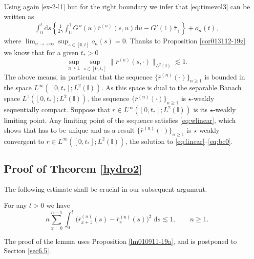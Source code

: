 \documentclass[EJP]{ejpecp} %
\newcommand\T{{\mathbb I}}
\renewcommand{\ge}{\geqslant}
\newcommand{\dd  }{\mathrm{d}}
\renewcommand{\bar}{\overline}
\numberwithin{equation}{section}
\begin{document}
Using again \eqref{ex-2-l1} but for the right boundary we infer that
\eqref{eq:timevol3} can be written as
\begin{equation}\label{eq:timevol31}
  \begin{split}
\int_0^t \dd s\left\{ \frac{1}{2\gamma}\int_0^1G''(u) \bar r^{(n)}(s,u)\dd u- G'(1) \bar\tau_+
\right\}
+o_n(t),
  \end{split}
\end{equation}
 where $\lim_{n\to+\infty} \sup_{s\in[0,t]}o_n(s)=0$.
Thanks to Proposition \ref{cor013112-19z} we know that for a given $t_*>0$
\begin{equation}
\label{010203}
\sup_{n\ge1}\sup_{s\in[0,t_*]}\big\|\bar
r^{(n)}(s,\cdot)\big\|_{L^2(\T)}\lesssim 1.
\end{equation}
The above means, in particular  that   the sequence $\{\bar
  r^{(n)}(\cdot)\}_{n\ge1}$ is bounded in the space $
L^\infty([0,t_*];L^2(\T))$. As this space is dual to the separable
Banach space $L^1([0,t_*];L^2(\T))$, the sequence $\{\bar
  r^{(n)}(\cdot)\}_{n\ge1}$ is $\star$-weakly
sequentially compact. Suppose that  $
r\in L^\infty([0,t_*];L^2(\T))$ is its $\star$-weakly limiting point. Any limiting point of the
sequence satisfies  
\eqref{eq:wlinear}, which shows that has to be unique and as a result $\{\bar
  r^{(n)}(\cdot)\}_{n\ge1}$ is $\star$-weakly
convergent to $
r\in L^\infty([0,t_*];L^2(\T))$, the solution to \eqref{eq:linear}--\eqref{eq:bc0}.  












\subsection{Proof of Theorem \ref{hydro2}}

\label{sec13.3.3}

The following estimate shall be crucial in our
subsequent argument.
\begin{lemma}
\label{lm010301-20}
For any $t>0$ we have
\begin{equation}
\label{060301-20}
n\sum_{x=0}^{n-1}\int_0^t\big(\bar r_{x+1}^{(n)}(s)-\bar
r_x^{(n)}(s)\big)^2\;\dd s\lesssim 1,\qquad n\ge1.
\end{equation}
\end{lemma}
The proof of the lemma uses Proposition \ref{lm010911-19a}, and  is postponed to Section
\ref{sec6.5}. 
\end{document}

